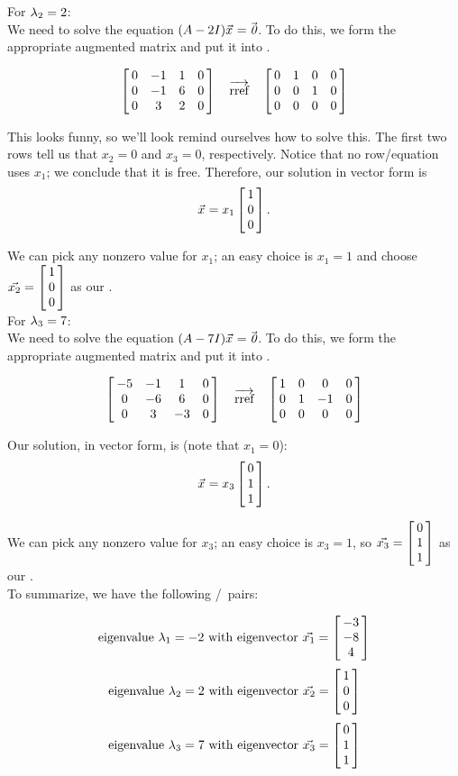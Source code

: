 {%

For $\lda_2 = 2$:\\

We need to solve the equation $(\tta - 2\tti)\vx = \zero$. To do this, we form the appropriate augmented matrix and put it into \rref.

$$\bmx{cccc} 0&-1&1&0\\ 0&-1&6&0 \\ 0&3&2&0  \emx \quad \overrightarrow{\text{rref}} \quad \bmx{cccc} 0&1&0&0\\0&0&1&0\\0&0&0&0\emx$$

This looks funny, so we'll look remind ourselves how to solve this. The first two rows tell us that $x_2 = 0$ and $x_3 = 0$, respectively. Notice that no row/equation uses $x_1$; we conclude that it is free. Therefore, our solution in vector form is $$\vx = x_1\bmx{c} 1\\0\\0\emx.$$
\drawexampleline

We can pick any nonzero value for $x_1$; an easy choice is $x_1 = 1$ and choose $\vx[2]=\bmx{c} 1\\0\\0\emx$ as our \ev.\\

For $\lda_3 = 7$:\\

We need to solve the equation $(\tta - 7\tti)\vx = \zero$. To do this, we form the appropriate augmented matrix and put it into \rref.

$$\bmx{cccc} -5&-1&1&0\\ 0&-6&6&0 \\ 0&3&-3&0  \emx \quad \overrightarrow{\text{rref}} \quad \bmx{cccc} 1&0&0&0\\0&1&-1&0\\0&0&0&0\emx$$

Our solution, in vector form, is (note that $x_1 = 0$): $$\vx = x_3\bmx{c} 0\\1\\1\emx.$$

We can pick any nonzero value for $x_3$; an easy choice is $x_3 = 1$, so $\vx[3]=\bmx{c} 0\\1\\1\emx$ as our \ev.\\

To summarize, we have the following \el/\ev\ pairs: 

$$\text{\el\ } \lda_1=-2 \text{ with \ev\ } \vx[1] = \bmx{c}-3\\-8\\4\emx$$ 
$$\text{\el\ } \lda_2=2 \text{ with \ev\ } \vx[2] = \bmx{c}1\\0\\0\emx$$ 
$$\text{\el\ } \lda_3=7 \text{ with \ev\ } \vx[3] = \bmx{c}0\\1\\1\emx$$
\ } \\ %

